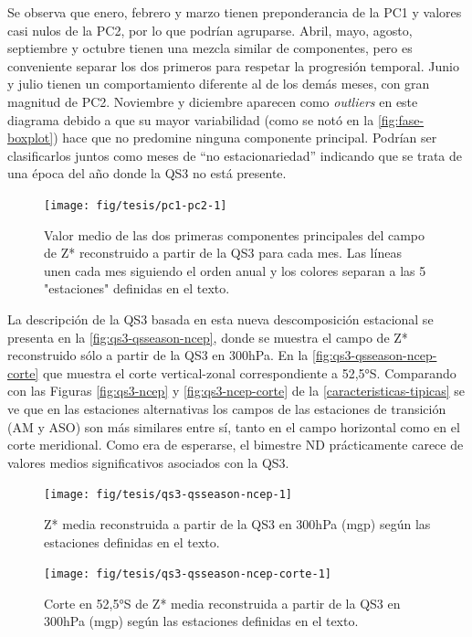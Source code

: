 \documentclass[spanish,a4paper,12pt,oneside]{book}
\begin{document}
Se observa que enero, febrero y marzo tienen preponderancia de la PC1 y
valores casi nulos de la PC2, por lo que podrían agruparse. Abril, mayo,
agosto, septiembre y octubre tienen una mezcla similar de componentes,
pero es conveniente separar los dos primeros para respetar la progresión
temporal. Junio y julio tienen un comportamiento diferente al de los
demás meses, con gran magnitud de PC2. Noviembre y diciembre aparecen
como \emph{outliers} en este diagrama debido a que su mayor variabilidad
(como se notó en la \autoref{fig:fase-boxplot}) hace que no predomine
ninguna componente principal. Podrían ser clasificarlos juntos como
meses de ``no estacionariedad'' indicando que se trata de una época del
año donde la QS3 no está presente.

\begin{figure}
\texttt{[image: fig/tesis/pc1-pc2-1]} \caption{Valor medio de las dos primeras componentes principales del campo de Z* reconstruido a partir de la QS3 para cada mes. Las líneas unen cada mes siguiendo el orden anual y los colores separan a las 5 "estaciones" definidas en el texto.}\label{fig:pc1-pc2}
\end{figure}

La descripción de la QS3 basada en esta nueva descomposición estacional
se presenta en la \autoref{fig:qs3-qsseason-ncep}, donde se muestra el
campo de Z* reconstruido sólo a partir de la QS3 en 300hPa. En la
\autoref{fig:qs3-qsseason-ncep-corte} que muestra el corte
vertical-zonal correspondiente a 52,5°S. Comparando con las Figuras
\ref{fig:qs3-ncep} y \ref{fig:qs3-ncep-corte} de la
\autoref{caracteristicas-tipicas} se ve que en las estaciones
alternativas los campos de las estaciones de transición (AM y ASO) son
más similares entre sí, tanto en el campo horizontal como en el corte
meridional. Como era de esperarse, el bimestre ND prácticamente carece
de valores medios significativos asociados con la QS3.

\begin{figure}
\texttt{[image: fig/tesis/qs3-qsseason-ncep-1]} \caption{Z* media reconstruida a partir de la QS3 en 300hPa (mgp) según las estaciones definidas en el texto.}\label{fig:qs3-qsseason-ncep}
\end{figure}

\begin{figure}
\texttt{[image: fig/tesis/qs3-qsseason-ncep-corte-1]} \caption{Corte en 52,5°S de Z* media reconstruida a partir de la QS3 en 300hPa (mgp) según las estaciones definidas en el texto.}\label{fig:qs3-qsseason-ncep-corte}
\end{figure}
\end{document}
